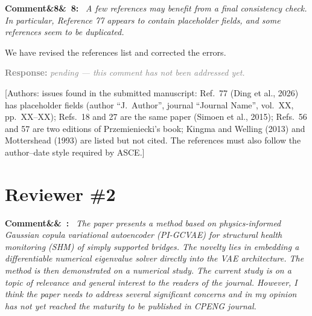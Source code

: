 \documentclass[11pt]{article}
\newenvironment{rcomment}[1]{\par\bigskip\noindent\textbf{Comment\ifx&#1&\else\ #1\fi:}\ \itshape}{\par}
\newenvironment{response}{\par\smallskip\noindent\color{resp}\textbf{Response:}\ }{\par}
\newcommand{\pending}{\par\smallskip\noindent\textcolor{gray}{\textbf{Response:} \textit{pending --- this comment
has not been addressed yet.}}\par}
\newcommand{\authornote}[1]{\textcolor{note}{\textsf{[Authors: #1]}}}
\begin{document}
\begin{rcomment}{8}
A few references may benefit from a final consistency check. In particular, Reference 77 appears to contain placeholder fields, and some references seem to be duplicated.
\end{rcomment}
We have revised the references list and corrected the errors. 

\pending
\authornote{issues found in the submitted manuscript: Ref.~77 (Ding et al., 2026) has placeholder fields (author
``J.~Author'', journal ``Journal Name'', vol.~XX, pp.~XX--XX); Refs.~18 and 27 are the same paper (Simoen et al., 2015);
Refs.~56 and 57 are two editions of Przemieniecki's book; Kingma and Welling (2013) and Mottershead (1993) are listed but
not cited. The references must also follow the author--date style required by ASCE.}

\section{Reviewer \#2}

\begin{rcomment}{}
The paper presents a method based on physics-informed Gaussian copula variational autoencoder (PI-GCVAE) for
structural health monitoring (SHM) of simply supported bridges. The novelty lies in embedding a differentiable numerical
eigenvalue solver directly into the VAE architecture. The method is then demonstrated on a numerical study. The current
study is on a topic of relevance and general interest to the readers of the journal. However, I think the paper needs to
address several significant concerns and in my opinion has not yet reached the maturity to be published in CPENG
journal.
\end{rcomment}
%
\end{document}
